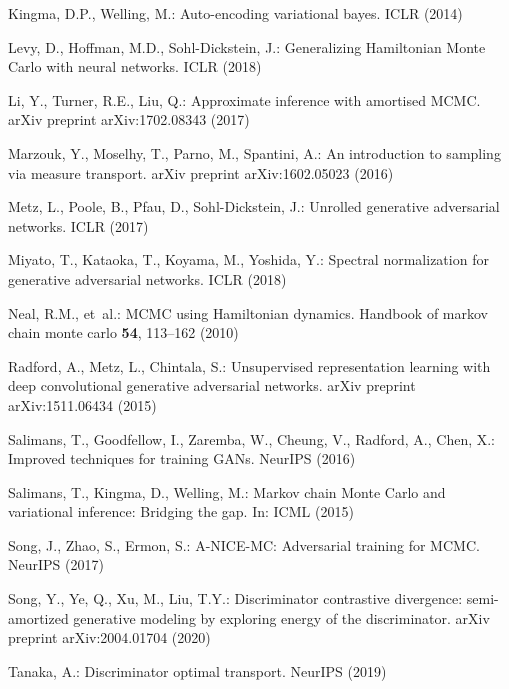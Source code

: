 \documentclass[runningheads]{llncs}
\newcommand{\<}{\left\langle}
\renewcommand{\>}{\right\rangle}
\begin{document}
\begin{thebibliography}{10}
  Kingma, D.P., Welling, M.: Auto-encoding variational bayes. ICLR  (2014)
  
  Levy, D., Hoffman, M.D., Sohl-Dickstein, J.: Generalizing {Hamiltonian Monte
    Carlo} with neural networks. ICLR  (2018)
  
  Li, Y., Turner, R.E., Liu, Q.: Approximate inference with amortised {MCMC}.
    arXiv preprint arXiv:1702.08343  (2017)
  
  Marzouk, Y., Moselhy, T., Parno, M., Spantini, A.: An introduction to sampling
    via measure transport. arXiv preprint arXiv:1602.05023  (2016)
  
  Metz, L., Poole, B., Pfau, D., Sohl-Dickstein, J.: Unrolled generative
    adversarial networks. ICLR  (2017)
  
  Miyato, T., Kataoka, T., Koyama, M., Yoshida, Y.: Spectral normalization for
    generative adversarial networks. ICLR  (2018)
  
  Neal, R.M., et~al.: {MCMC} using {Hamiltonian} dynamics. Handbook of markov
    chain monte carlo  \textbf{54},  113--162 (2010)
  
  Radford, A., Metz, L., Chintala, S.: Unsupervised representation learning with
    deep convolutional generative adversarial networks. arXiv preprint
    arXiv:1511.06434  (2015)
  
  Salimans, T., Goodfellow, I., Zaremba, W., Cheung, V., Radford, A., Chen, X.:
    Improved techniques for training {GANs}. NeurIPS  (2016)
  
  Salimans, T., Kingma, D., Welling, M.: {Markov chain Monte Carlo} and
    variational inference: Bridging the gap. In: ICML (2015)
  
  Song, J., Zhao, S., Ermon, S.: {A-NICE-MC}: Adversarial training for {MCMC}.
    NeurIPS  (2017)
  
  Song, Y., Ye, Q., Xu, M., Liu, T.Y.: Discriminator contrastive divergence:
    semi-amortized generative modeling by exploring energy of the discriminator.
    arXiv preprint arXiv:2004.01704  (2020)
  
  Tanaka, A.: Discriminator optimal transport. NeurIPS  (2019)
  

\end{thebibliography}
\end{document}
